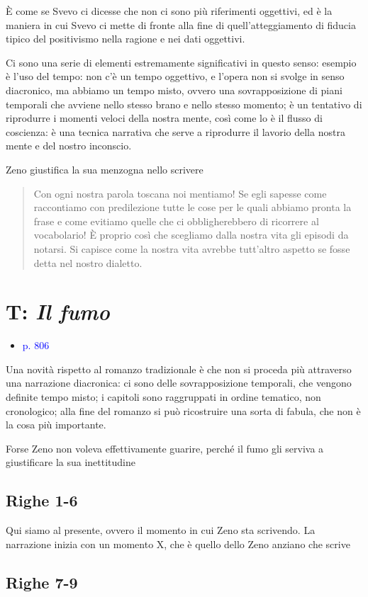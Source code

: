 \documentclass[a4paper, twoside, titlepage]{book}
\newcommand{\elenco}[1]{%
\begin{itemize}
#1
\end{itemize}}
\newcommand{\citazione}[1]{%
  \begin{quotation}
  \noindent #1
  \end{quotation}}
\renewcommand{\emph}[1]{\textcolor{blue}{#1}}
\begin{document}
È come se Svevo ci dicesse che non ci sono più riferimenti oggettivi, ed è la maniera in cui Svevo ci mette di fronte alla fine di quell'atteggiamento di fiducia tipico del positivismo nella ragione e nei dati oggettivi.

Ci sono una serie di elementi estremamente significativi in questo senso: esempio è l'uso del tempo: non c'è un tempo oggettivo, e l'opera non si svolge in senso diacronico, ma abbiamo un tempo misto, ovvero una sovrapposizione di piani temporali che avviene nello stesso brano e nello stesso momento; è un tentativo di riprodurre i momenti veloci della nostra mente, così come lo è il flusso di coscienza: è una tecnica narrativa che serve a riprodurre il lavorio della nostra mente e del nostro inconscio.

Zeno giustifica la sua menzogna nello scrivere
\citazione{Con ogni nostra parola toscana noi mentiamo! Se egli sapesse come raccontiamo con predilezione tutte le cose per le quali abbiamo pronta la frase e come evitiamo quelle che ci obbligherebbero di ricorrere al vocabolario! È proprio così che scegliamo dalla nostra vita gli episodi da notarsi. Si capisce come la nostra vita avrebbe tutt'altro aspetto se fosse detta nel nostro dialetto.}

\section{T: \textit{Il fumo}}
\elenco{\item \emph{p. 806}}

Una novità rispetto al romanzo tradizionale è che non si proceda più attraverso una narrazione diacronica: ci sono delle sovrapposizione temporali, che vengono definite tempo misto;
i capitoli sono raggruppati in ordine tematico, non cronologico; alla fine del romanzo si può ricostruire una sorta di fabula, che non è la cosa più importante.

Forse Zeno non voleva effettivamente guarire, perché il fumo gli serviva a giustificare la sua inettitudine

\subsection*{Righe 1-6}

Qui siamo al presente, ovvero il momento in cui Zeno sta scrivendo. La narrazione inizia con un momento X, che è quello dello Zeno anziano che scrive

\subsection*{Righe 7-9}
\end{document}
